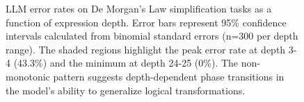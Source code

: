 \documentclass[11pt,a4paper]{article}
\begin{document}
\begin{figure}[h!]
\caption{LLM error rates on De Morgan's Law simplification tasks as a function of expression depth. 
Error bars represent 95\% confidence intervals calculated from binomial standard errors (n=300 per depth range). 
The shaded regions highlight the peak error rate at depth 3-4 (43.3\%) and the minimum at depth 24-25 (0\%). 
The non-monotonic pattern suggests depth-dependent phase transitions in the model's ability to generalize logical transformations.}
\label{fig:error_rates}
\end{figure}
\end{document}
